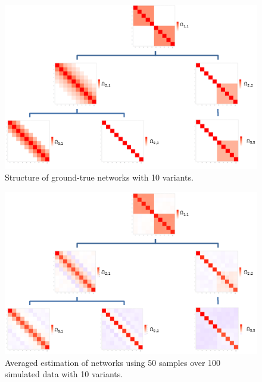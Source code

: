 \documentclass[10pt]{article}
\begin{document}
\begin{figure}
\begin{center}
 \includegraphics{graph.png}
\end{center}
\caption{Structure of ground-true networks with 10 variants.}
\label{fig:structure1}
\end{figure}



\begin{figure}
\begin{center}
\includegraphics{graphhat100.png}
\end{center}
\caption{Averaged estimation of networks using 50 samples over 100 simulated data with 10 variants.}
\label{fig:structur2}
\end{figure}
\end{document}
